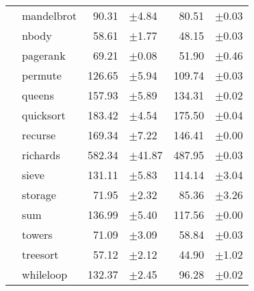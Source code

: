 \begin{tabular}{ll@{\hspace{6pt}}r@{\hspace{3pt}}l@{\hspace{6pt}}r@{\hspace{3pt}}l}
 & mandelbrot & 90.31 & \scriptsize\textcolor{gray!60}{$\pm$4.84} & 80.51 & \scriptsize\textcolor{gray!60}{$\pm$0.03} \\
 & nbody & 58.61 & \scriptsize\textcolor{gray!60}{$\pm$1.77} & 48.15 & \scriptsize\textcolor{gray!60}{$\pm$0.03} \\
 & pagerank & 69.21 & \scriptsize\textcolor{gray!60}{$\pm$0.08} & 51.90 & \scriptsize\textcolor{gray!60}{$\pm$0.46} \\
 & permute & 126.65 & \scriptsize\textcolor{gray!60}{$\pm$5.94} & 109.74 & \scriptsize\textcolor{gray!60}{$\pm$0.03} \\
 & queens & 157.93 & \scriptsize\textcolor{gray!60}{$\pm$5.89} & 134.31 & \scriptsize\textcolor{gray!60}{$\pm$0.02} \\
 & quicksort & 183.42 & \scriptsize\textcolor{gray!60}{$\pm$4.54} & 175.50 & \scriptsize\textcolor{gray!60}{$\pm$0.04} \\
 & recurse & 169.34 & \scriptsize\textcolor{gray!60}{$\pm$7.22} & 146.41 & \scriptsize\textcolor{gray!60}{$\pm$0.00} \\
 & richards & 582.34 & \scriptsize\textcolor{gray!60}{$\pm$41.87} & 487.95 & \scriptsize\textcolor{gray!60}{$\pm$0.03} \\
 & sieve & 131.11 & \scriptsize\textcolor{gray!60}{$\pm$5.83} & 114.14 & \scriptsize\textcolor{gray!60}{$\pm$3.04} \\
 & storage & 71.95 & \scriptsize\textcolor{gray!60}{$\pm$2.32} & 85.36 & \scriptsize\textcolor{gray!60}{$\pm$3.26} \\
 & sum & 136.99 & \scriptsize\textcolor{gray!60}{$\pm$5.40} & 117.56 & \scriptsize\textcolor{gray!60}{$\pm$0.00} \\
 & towers & 71.09 & \scriptsize\textcolor{gray!60}{$\pm$3.09} & 58.84 & \scriptsize\textcolor{gray!60}{$\pm$0.03} \\
 & treesort & 57.12 & \scriptsize\textcolor{gray!60}{$\pm$2.12} & 44.90 & \scriptsize\textcolor{gray!60}{$\pm$1.02} \\
 & whileloop & 132.37 & \scriptsize\textcolor{gray!60}{$\pm$2.45} & 96.28 & \scriptsize\textcolor{gray!60}{$\pm$0.02} \\
\bottomrule
\end{tabular}